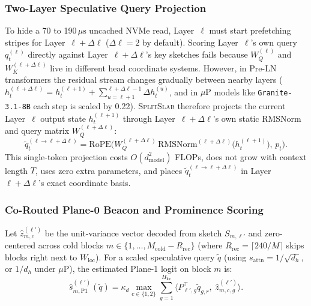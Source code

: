 \documentclass[pdflatex,sn-mathphys-num]{sn-jnl}
\theoremstyle{thmstyleone}
\newcommand{\SplitSlab}{\textsc{SplitSlab}}
\newcommand{\RoPE}{\mathrm{RoPE}}
\begin{document}
\subsubsection{Two-Layer Speculative Query Projection}
To hide a 70 to 190\,$\mu\mathrm{s}$ uncached NVMe read, Layer~$\ell$ must start prefetching stripes for Layer~$\ell + \Delta\ell$ ($\Delta\ell = 2$ by default). Scoring Layer~$\ell$'s own query $q_t^{(\ell)}$ directly against Layer~$\ell+\Delta\ell$'s key sketches fails because $W_Q^{(\ell)}$ and $W_K^{(\ell+\Delta\ell)}$ live in different head coordinate systems. However, in Pre-LN transformers the residual stream changes gradually between nearby layers ($h_t^{(\ell+\Delta\ell)} = h_t^{(\ell+1)} + \sum_{u=\ell+1}^{\ell+\Delta\ell-1} \Delta h_t^{(u)}$, and in $\mu\text{P}$ models like \texttt{Granite-3.1-8B} each step is scaled by 0.22). \SplitSlab{} therefore projects the current Layer~$\ell$ output state $h_t^{(\ell+1)}$ through Layer~$\ell+\Delta\ell$'s own static RMSNorm and query matrix $W_Q^{(\ell+\Delta\ell)}$:
\begin{equation}\label{eq:spec_query}
\tilde{q}_t^{(\ell \to \ell+\Delta\ell)} = \RoPE\!\Big(W_Q^{(\ell+\Delta\ell)}\,\mathrm{RMSNorm}^{(\ell+\Delta\ell)}\!\big(h_t^{(\ell+1)}\big),\, p_t\Big).
\end{equation}
This single-token projection costs $O(d_{\mathrm{model}}^2)$ FLOPs, does not grow with context length $T$, uses zero extra parameters, and places $\tilde{q}_t^{(\ell\to\ell+\Delta\ell)}$ in Layer~$\ell+\Delta\ell$'s exact coordinate basis.

\subsubsection{Co-Routed Plane-0 Beacon and Prominence Scoring}
Let $\hat{z}_{m,c}^{(\ell')}$ be the unit-variance vector decoded from sketch $S_{m,\ell'}$ and zero-centered across cold blocks $m \in \{1, \dots, M_{\mathrm{cold}} - R_{\mathrm{rec}}\}$ (where $R_{\mathrm{rec}} = \lceil 240/M \rceil$ skips blocks right next to $W_{\mathrm{loc}}$). For a scaled speculative query $\tilde{q}$ (using $s_{\mathrm{attn}} = 1/\sqrt{d_h}$, or $1/d_h$ under $\mu\text{P}$), the estimated Plane-1 logit on block $m$ is:
\begin{equation}\label{eq:sketch_logit}
\hat{s}_{m,\mathrm{P1}}^{(\ell')}(\tilde{q}) = \kappa_d \max_{c \in \{1, 2\}} \sum_{g=1}^{H_{\mathrm{kv}}} \big\langle P_{\ell',g}^\top \tilde{q}_{g,r},\; \hat{z}_{m,c,g}^{(\ell')} \big\rangle.
\end{equation}
\end{document}
